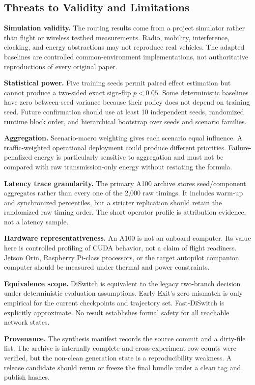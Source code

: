 \documentclass[drones,article,submit,moreauthors]{Definitions/mdpi}
\newcommand{\DS}{DiSwitch}\newcommand{\FastDS}{Fast-DiSwitch}
\begin{document}
\subsection{Threats to Validity and Limitations}

\textbf{Simulation validity.} The routing results come from a project simulator rather than flight or wireless testbed measurements. Radio, mobility, interference, clocking, and energy abstractions may not reproduce real vehicles. The adapted baselines are controlled common-environment implementations, not authoritative reproductions of every original paper.

\textbf{Statistical power.} Five training seeds permit paired effect estimation but cannot produce a two-sided exact sign-flip $p<0.05$. Some deterministic baselines have zero between-seed variance because their policy does not depend on training seed. Future confirmation should use at least 10 independent seeds, randomized runtime block order, and hierarchical bootstrap over seeds and scenario families.

\textbf{Aggregation.} Scenario-macro weighting gives each scenario equal influence. A traffic-weighted operational deployment could produce different priorities. Failure-penalized energy is particularly sensitive to aggregation and must not be compared with raw transmission-only energy without restating the formula.

\textbf{Latency trace granularity.} The primary A100 archive stores seed/component aggregates rather than every one of the 2,000 raw timings. It includes warm-up and synchronized percentiles, but a stricter replication should retain the randomized raw timing order. The short operator profile is attribution evidence, not a latency sample.

\textbf{Hardware representativeness.} An A100 is not an onboard computer. Its value here is controlled profiling of CUDA behavior, not a claim of flight readiness. Jetson Orin, Raspberry Pi-class processors, or the target autopilot companion computer should be measured under thermal and power constraints.

\textbf{Equivalence scope.} \DS{} is equivalent to the legacy two-branch decision under deterministic evaluation assumptions. Early Exit's zero mismatch is only empirical for the current checkpoints and trajectory set. \FastDS{} is explicitly approximate. No result establishes formal safety for all reachable network states.

\textbf{Provenance.} The synthesis manifest records the source commit and a dirty-file list. The archive is internally complete and cross-experiment row counts were verified, but the non-clean generation state is a reproducibility weakness. A release candidate should rerun or freeze the final bundle under a clean tag and publish hashes.
\end{document}
